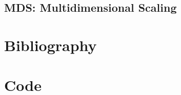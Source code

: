 \documentclass[a4paper,11pt,spanish]{report}
\begin{document}
\section{MDS: Multidimensional Scaling}
\label{MDS}



\chapter*{Bibliography}
\label{chap:bib}

% 


\chapter*{Code}
\label{chap:code}

\end{document}
